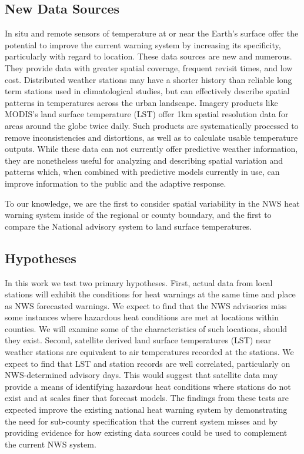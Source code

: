 \documentclass{ametsoc}
\begin{document}
\subsection{New Data Sources} \label{subsec:newDataSources}
In situ and remote sensors of temperature at or near the Earth's surface offer the potential to improve the current warning system by increasing its specificity, particularly with regard to location. These data sources are new and numerous. They provide data with greater spatial coverage, frequent revisit times, and low cost. Distributed weather stations may have a shorter history than reliable long term stations used in climatological studies, but can effectively describe spatial patterns in temperatures across the urban landscape. Imagery products like MODIS's land surface temperature (LST) offer 1km spatial resolution data for areas around the globe twice daily. Such products are systematically processed to remove inconsistencies and distortions, as well as to calculate usable temperature outputs. While these data can not currently offer predictive weather information, they are nonetheless useful for analyzing and describing spatial variation and patterns which, when combined with predictive models currently in use, can improve information to the public and the adaptive response.

To our knowledge, we are the first to consider spatial variability in the NWS heat warning system inside of the regional or county boundary, and the first to compare the National advisory system to land surface temperatures.

\subsection{Hypotheses} \label{subsec:hypotheses}
In this work we test two primary hypotheses. First, actual data from local stations will exhibit the conditions for heat warnings at the same time and place as NWS forecasted warnings. We expect to find that the NWS advisories miss some instances where hazardous heat conditions are met at locations within counties. We will examine some of the characteristics of such locations, should they exist. Second, satellite derived land surface temperatures (LST) near weather stations are equivalent to air temperatures recorded at the stations. We expect to find that LST and station records are well correlated, particularly on NWS-determined advisory days. This would suggest that satellite data may provide a means of identifying hazardous heat conditions where stations do not exist and at scales finer that forecast models. The findings from these tests are expected improve the existing national heat warning system by demonstrating the need for sub-county specification that the current system misses and by providing evidence for how existing data sources could be used to complement the current NWS system. 
\end{document}
